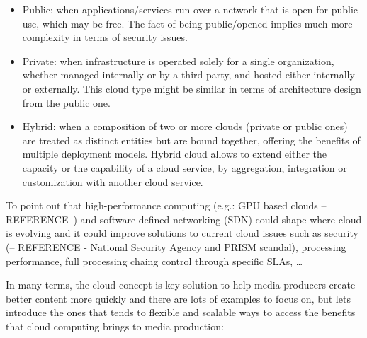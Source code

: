 \begin{itemize}
\item Public: when applications/services run over a network that is open for public use, which may be free. The fact of being public/opened implies much more complexity in terms of security issues.
\item Private: when infrastructure is operated solely for a single organization, whether managed internally or by a third-party, and hosted either internally or externally. This cloud type might be similar in terms of architecture design from the public one.
\item Hybrid: when a composition of two or more clouds (private or public ones) are treated as distinct entities but are bound together, offering the benefits of multiple deployment models. Hybrid cloud allows to extend either the capacity or the capability of a cloud service, by aggregation, integration or customization with another cloud service.
\end{itemize}

To point out that high-performance computing (e.g.: GPU based clouds --REFERENCE--) and software-defined networking (SDN) could shape where cloud is evolving and it could improve solutions to current cloud issues such as security (-- REFERENCE - National Security Agency and PRISM scandal), processing performance, full processing chaing control through specific SLAs, \ldots

In many terms, the cloud concept is key solution to help media producers create better content more quickly and there are lots of examples to focus on, but lets introduce the ones that tends to flexible and scalable ways to access the benefits that cloud computing brings to media production:


